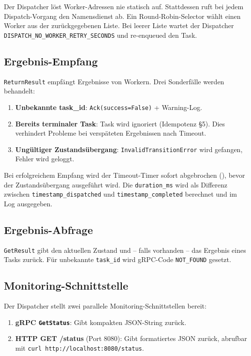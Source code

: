 Der Dispatcher löst Worker-Adressen nie statisch auf.
Stattdessen ruft  bei jedem
Dispatch-Vorgang den Namensdienst ab.
Ein Round-Robin-Selector wählt einen Worker aus der zurückgegebenen Liste.
Bei leerer Liste wartet der Dispatcher \texttt{DISPATCH\_NO\_WORKER\_RETRY\_SECONDS}
und re-enqueued den Task.

\subsection{Ergebnis-Empfang}

\texttt{ReturnResult} empfängt Ergebnisse von Workern.
Drei Sonderfälle werden behandelt:

\begin{enumerate}
  \item \textbf{Unbekannte task\_id}: \texttt{Ack(success=False)} + Warning-Log.
  \item \textbf{Bereits terminaler Task}: Task wird ignoriert (Idempotenz §5).
        Dies verhindert Probleme bei verspäteten Ergebnissen nach Timeout.
  \item \textbf{Ungültiger Zustandsübergang}: \texttt{InvalidTransitionError}
        wird gefangen, Fehler wird geloggt.
\end{enumerate}

\noindent Bei erfolgreichem Empfang wird der Timeout-Timer sofort abgebrochen
(), bevor der
Zustandsübergang ausgeführt wird.
Die \texttt{duration\_ms} wird als Differenz zwischen
\texttt{timestamp\_dispatched} und \texttt{timestamp\_completed} berechnet
und im Log ausgegeben.

\subsection{Ergebnis-Abfrage}

\texttt{GetResult} gibt den aktuellen Zustand und -- falls vorhanden --
das Ergebnis eines Tasks zurück.
Für unbekannte \texttt{task\_id} wird gRPC-Code \texttt{NOT\_FOUND} gesetzt.

\subsection{Monitoring-Schnittstelle}

Der Dispatcher stellt zwei parallele Monitoring-Schnittstellen bereit:

\begin{enumerate}
  \item \textbf{gRPC \texttt{GetStatus}}: Gibt kompakten JSON-String zurück.
  \item \textbf{HTTP GET /status} (Port 8080): Gibt formatiertes JSON zurück,
        abrufbar mit \texttt{curl http://localhost:8080/status}.
\end{enumerate}

